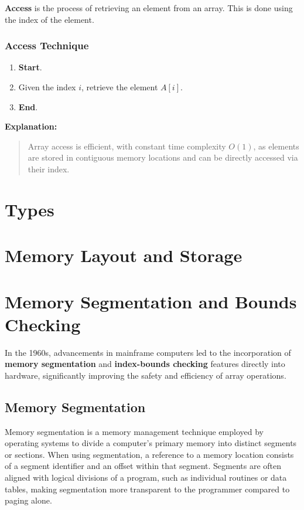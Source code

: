 \documentclass{book}
\begin{document}
\textbf{Access} is the process of retrieving an element from an array. This is done using the index of the element.

\subsubsection*{Access Technique}

\begin{enumerate}
	\item \textbf{Start}.
	\item Given the index $i$, retrieve the element $A[i]$.
	\item \textbf{End}.
\end{enumerate}

\textbf{Explanation:}
\begin{quote}
	Array access is efficient, with constant time complexity $O(1)$, as elements are stored in contiguous memory locations and can be directly accessed via their index.
\end{quote}

\section{Types}
\section{Memory Layout and Storage}
\section{Memory Segmentation and Bounds Checking}

In the 1960s, advancements in mainframe computers led to the incorporation of \textbf{memory segmentation} and \textbf{index-bounds checking} features directly into hardware, significantly improving the safety and efficiency of array operations.

\subsection{Memory Segmentation}
Memory segmentation is a memory management technique employed by operating systems to divide a computer's primary memory into distinct segments or sections. When using segmentation, a reference to a memory location consists of a segment identifier and an offset within that segment. Segments are often aligned with logical divisions of a program, such as individual routines or data tables, making segmentation more transparent to the programmer compared to paging alone. 
\end{document}
